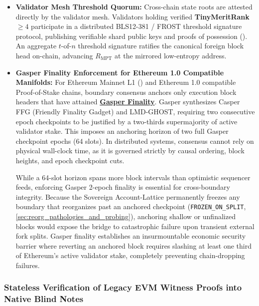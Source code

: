 \documentclass[a4paper,11pt,twoside,parskip=half-,headings=small]{scrartcl}
\newcommand{\code}[1]{\texttt{#1}}
\newcommand{\concept}[2]{\hyperlink{glossary:#1}{\textbf{#2}}}
\begin{document}
\begin{itemize}[nosep]
  \item \textbf{Validator Mesh Threshold Quorum:}
  Cross-chain state roots are attested directly by the validator mesh. Validators holding verified \textbf{TinyMeritRank $\ge 4$} participate in a distributed BLS12-381 / FROST threshold signature protocol, publishing verifiable shard public keys and proofs of possession (). An aggregate $t$-of-$n$ threshold signature ratifies the canonical foreign block head on-chain, advancing $R_{\text{MPT}}$ at the mirrored low-entropy address.

  \item \textbf{Gasper Finality Enforcement for Ethereum 1.0 Compatible Manifolds:}
  For Ethereum Mainnet L1 () and Ethereum 1.0 compatible Proof-of-Stake chains, boundary consensus anchors only execution block headers that have attained \concept{gasper}{Gasper Finality}. Gasper synthesizes Casper FFG (Friendly Finality Gadget) and LMD-GHOST, requiring two consecutive epoch checkpoints to be justified by a two-thirds supermajority of active validator stake. This imposes an anchoring horizon of two full Gasper checkpoint epochs (64 slots). In distributed systems, consensus cannot rely on physical wall-clock time, as it is governed strictly by causal ordering, block heights, and epoch checkpoint cuts.
  
  While a 64-slot horizon spans more block intervals than optimistic sequencer feeds, enforcing Gasper 2-epoch finality is essential for cross-boundary integrity. Because the Sovereign Account-Lattice permanently freezes any boundary that reorganizes past an anchored checkpoint (\code{FROZEN\_ON\_SPLIT}, \cref{sec:reorg_pathologies_and_probing}), anchoring shallow or unfinalized blocks would expose the bridge to catastrophic failure upon transient external fork splits. Gasper finality establishes an insurmountable economic security barrier where reverting an anchored block requires slashing at least one third of Ethereum's active validator stake, completely preventing chain-dropping failures.
\end{itemize}

\subsubsection{Stateless Verification of Legacy EVM Witness Proofs into Native Blind Notes}
\end{document}
